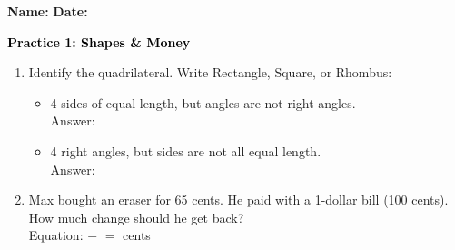 \documentclass[12pt, letterpaper, fleqn]{article}
\newcommand{\blank}{\underline{\hspace{2.2cm}}}
\begin{document}
\textbf{Name:} \underline{\hspace{5cm}}
\hfill
\textbf{Date:} \underline{\hspace{3cm}}\\

\begin{tcolorbox}[colback=customteal!20]
    \large\textcolor{black}{\textbf{Practice 1: Shapes \& Money}}
\end{tcolorbox}

\vspace{5mm}
\begin{enumerate}[itemsep=3cm, leftmargin=0.6cm]
\item Identify the quadrilateral. Write Rectangle, Square, or Rhombus:
  \begin{itemize}[itemsep=1cm]
    \item 4 sides of equal length, but angles are not right angles. \\ Answer: \blank
    \item 4 right angles, but sides are not all equal length. \\ Answer: \blank
  \end{itemize}

\item Max bought an eraser for 65 cents. He paid with a 1-dollar bill (100 cents). How much change should he get back?
\\
Equation: \blank $-$ \blank $=$ \blank cents
\end{enumerate}
\end{document}
